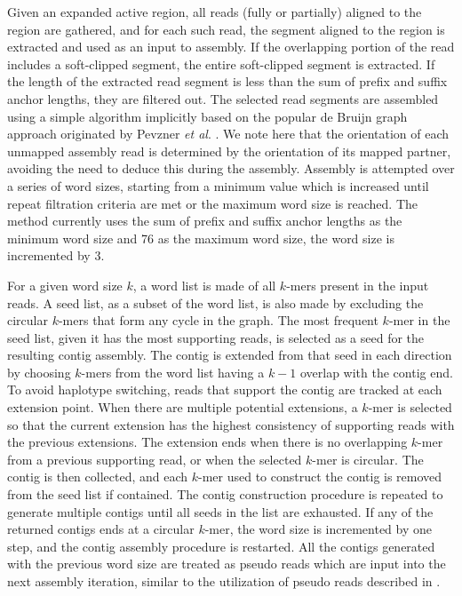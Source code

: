 \documentclass{article}
\begin{document}
Given an expanded active region, all reads (fully or partially) aligned to the region are gathered, and for each such read, the segment aligned to the region is extracted and used as an input to assembly. If the overlapping portion of the read includes a soft-clipped segment, the entire soft-clipped segment is extracted. If the length of the extracted read segment is less than the sum of prefix and suffix anchor lengths, they are filtered out. The selected read segments are assembled using a simple algorithm implicitly based on the popular de Bruijn graph approach originated by Pevzner \textit{et al}. \citep{pevzner2001}. We note here that the orientation of each unmapped assembly read is determined by the orientation of its mapped partner, avoiding the need to deduce this during the assembly. Assembly is attempted over a series of word sizes, starting from a minimum value which is increased until repeat filtration criteria are met or the maximum word size is reached. The method currently uses the sum of prefix and suffix anchor lengths as the minimum word size and 76 as the maximum word size, the word size is incremented by 3.

For a given word size $k$, a word list is made of all $k$-mers present in the input reads. A seed list, as a subset of the word list, is also made by excluding the circular $k$-mers that form any cycle in the graph. The most frequent $k$-mer in the seed list, given it has the most supporting reads, is selected as a seed for the resulting contig assembly. The contig is extended from that seed in each direction by choosing $k$-mers from the word list having a $k-1$ overlap with the contig end. To avoid haplotype switching, reads that support the contig are tracked at each extension point. When there are multiple potential extensions, a $k$-mer is selected so that the current extension has the highest consistency of supporting reads with the previous extensions. The extension ends when there is no overlapping $k$-mer from a previous supporting read, or when the selected $k$-mer is circular. The contig is then collected, and each $k$-mer used to construct the contig is removed from the seed list if contained. The contig construction procedure is repeated to generate multiple contigs until all seeds in the list are exhausted. If any of the returned contigs ends at a circular $k$-mer, the word size is incremented by one step, and the contig assembly procedure is restarted. All the contigs generated with the previous word size are treated as pseudo reads which are input into the next assembly iteration, similar to the utilization of pseudo reads described in \cite{tigra2014}.
\end{document}
